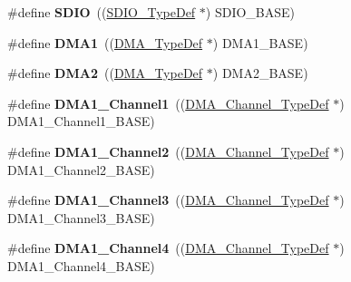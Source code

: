 \begin{DoxyCompactItemize}
\item 
\hypertarget{group___peripheral__declaration_ga8149aa2760fffac16bc75216d5fd9331}{\#define {\bfseries S\-D\-I\-O}~((\hyperlink{struct_s_d_i_o___type_def}{S\-D\-I\-O\-\_\-\-Type\-Def} $\ast$) S\-D\-I\-O\-\_\-\-B\-A\-S\-E)}\label{group___peripheral__declaration_ga8149aa2760fffac16bc75216d5fd9331}

\item 
\hypertarget{group___peripheral__declaration_gacc16d2a5937f7585320a98f7f6b578f9}{\#define {\bfseries D\-M\-A1}~((\hyperlink{struct_d_m_a___type_def}{D\-M\-A\-\_\-\-Type\-Def} $\ast$) D\-M\-A1\-\_\-\-B\-A\-S\-E)}\label{group___peripheral__declaration_gacc16d2a5937f7585320a98f7f6b578f9}

\item 
\hypertarget{group___peripheral__declaration_ga506520140eec1708bc7570c49bdf972d}{\#define {\bfseries D\-M\-A2}~((\hyperlink{struct_d_m_a___type_def}{D\-M\-A\-\_\-\-Type\-Def} $\ast$) D\-M\-A2\-\_\-\-B\-A\-S\-E)}\label{group___peripheral__declaration_ga506520140eec1708bc7570c49bdf972d}

\item 
\hypertarget{group___peripheral__declaration_gac83c5be824be1c02716e2522e80ddf7a}{\#define {\bfseries D\-M\-A1\-\_\-\-Channel1}~((\hyperlink{struct_d_m_a___channel___type_def}{D\-M\-A\-\_\-\-Channel\-\_\-\-Type\-Def} $\ast$) D\-M\-A1\-\_\-\-Channel1\-\_\-\-B\-A\-S\-E)}\label{group___peripheral__declaration_gac83c5be824be1c02716e2522e80ddf7a}

\item 
\hypertarget{group___peripheral__declaration_ga23d7631dd10c645e06971b2543ba2949}{\#define {\bfseries D\-M\-A1\-\_\-\-Channel2}~((\hyperlink{struct_d_m_a___channel___type_def}{D\-M\-A\-\_\-\-Channel\-\_\-\-Type\-Def} $\ast$) D\-M\-A1\-\_\-\-Channel2\-\_\-\-B\-A\-S\-E)}\label{group___peripheral__declaration_ga23d7631dd10c645e06971b2543ba2949}

\item 
\hypertarget{group___peripheral__declaration_gacf7b6093a37b306d7f1f50b2f200f0d0}{\#define {\bfseries D\-M\-A1\-\_\-\-Channel3}~((\hyperlink{struct_d_m_a___channel___type_def}{D\-M\-A\-\_\-\-Channel\-\_\-\-Type\-Def} $\ast$) D\-M\-A1\-\_\-\-Channel3\-\_\-\-B\-A\-S\-E)}\label{group___peripheral__declaration_gacf7b6093a37b306d7f1f50b2f200f0d0}

\item 
\hypertarget{group___peripheral__declaration_gad2c42743316bf64da557130061b1f56a}{\#define {\bfseries D\-M\-A1\-\_\-\-Channel4}~((\hyperlink{struct_d_m_a___channel___type_def}{D\-M\-A\-\_\-\-Channel\-\_\-\-Type\-Def} $\ast$) D\-M\-A1\-\_\-\-Channel4\-\_\-\-B\-A\-S\-E)}\label{group___peripheral__declaration_gad2c42743316bf64da557130061b1f56a}


\end{DoxyCompactItemize}
